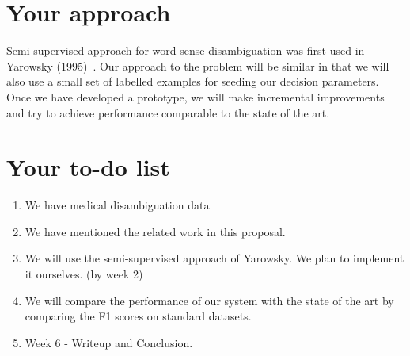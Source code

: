 \documentclass[11pt,letterpaper]{article}
\begin{document}
\section*{Your approach} 
Semi-supervised approach for word sense disambiguation was first used in Yarowsky (1995)~\cite{yarowsky1995unsupervised}. Our approach to the problem will be similar in that we will also use a small set of labelled examples for seeding our decision parameters. Once we have developed a prototype, we will make incremental improvements and try to achieve performance comparable to the state of the art.

\section*{Your to-do list}
\begin{enumerate}
\item We have medical disambiguation data
\item We have mentioned the related work in this proposal.
\item We will use the semi-supervised approach of Yarowsky. We plan to implement it ourselves. (by week 2)
\item We will compare the performance of our system with the state of the art by comparing the F1 scores on standard datasets.
\item Week 6 - Writeup and Conclusion.
\end{enumerate}



\end{document}
